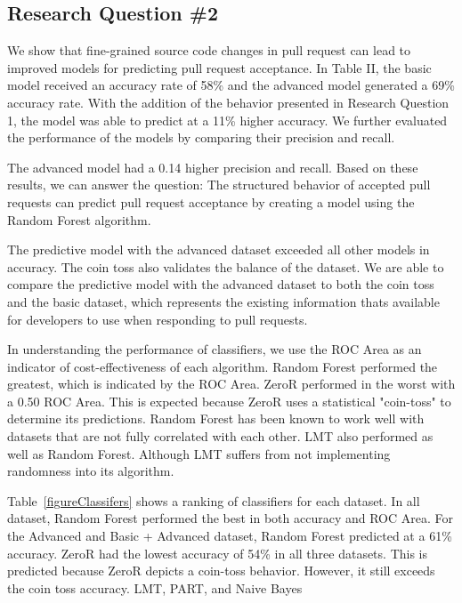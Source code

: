 \documentclass[10pt, conference]{IEEEtran}
\begin{document}
\subsection{Research Question \#2}
We show that fine-grained source code changes in pull request can lead to improved models for predicting pull request acceptance. In Table II, the basic model received an accuracy rate of 58\% and the advanced model generated a 69\% accuracy rate. With the addition of the behavior presented in Research Question 1, the model was able to predict at a 11\% higher accuracy. We further evaluated the performance of the models by comparing their precision and recall.

The advanced model had a 0.14 higher precision and recall. Based on these results, we can answer the question: The structured behavior of accepted pull requests can predict pull request acceptance by creating a model using the Random Forest algorithm.

The predictive model with the advanced dataset exceeded all other models in accuracy. The coin toss also validates the balance of the dataset. We are able to compare the predictive model with the advanced dataset to both the coin toss and the basic dataset, which represents the existing information that\textquotesingle s available for developers to use when responding to pull requests.

In understanding the performance of classifiers, we use the ROC Area as an indicator of cost-effectiveness of each algorithm. Random Forest performed the greatest, which is indicated by the ROC Area. ZeroR performed in the worst with a 0.50 ROC Area. This is expected because ZeroR uses a statistical "coin-toss" to determine its predictions. Random Forest has been known to work well with datasets that are not fully correlated with each other. LMT also performed as well as Random Forest. Although LMT suffers from not implementing randomness into its algorithm. 

Table~\ref{figureClassifers} shows a ranking of classifiers for each dataset. In all dataset, Random Forest performed the best in both accuracy and ROC Area. For the Advanced and Basic + Advanced dataset, Random Forest predicted at a 61\% accuracy. ZeroR had the lowest accuracy of 54\% in all three datasets. This is predicted because ZeroR depicts a coin-toss behavior. However, it still exceeds the coin toss accuracy. LMT, PART, and Naive Bayes 
\end{document}
